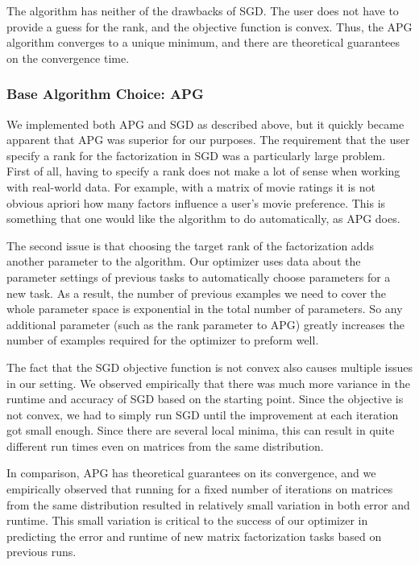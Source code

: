 The algorithm has neither of the drawbacks of SGD. The user does not have to provide a guess for the rank, and the objective function is convex. Thus, the APG algorithm converges to a unique minimum, and there are theoretical guarantees on the convergence time.

\subsubsection{Base Algorithm Choice: APG}
We implemented both APG and SGD as described above, but it quickly became apparent that APG was superior for our purposes. The requirement that the user specify a rank for the factorization in SGD was a particularly large problem. First of all, having to specify a rank does not make a lot of sense when working with real-world data. For example, with a matrix of movie ratings it is not obvious apriori how many factors influence a user's movie preference. This is something that one would like the algorithm to do automatically, as APG does.

The second issue is that choosing the target rank of the factorization adds another parameter to the algorithm. Our optimizer uses data about the parameter settings of previous tasks to automatically choose parameters for a new task. As a result, the number of previous examples we need to cover the whole parameter space is exponential in the total number of parameters. So any additional parameter (such as the rank parameter to APG) greatly increases the number of examples required for the optimizer to preform well.

The fact that the SGD objective function is not convex also causes multiple issues in our setting. We observed empirically that there was much more variance in the runtime and accuracy of SGD based on the starting point. Since the objective is not convex, we had to simply run SGD until the improvement at each iteration got small enough. Since there are several local minima, this can result in quite different run times even on matrices from the same distribution. 

In comparison, APG has theoretical guarantees on its convergence, and we empirically observed that running for a fixed number of iterations on matrices from the same distribution resulted in relatively small variation in both error and runtime. This small variation is critical to the success of our optimizer in predicting the error and runtime of new matrix factorization tasks based on previous runs.
